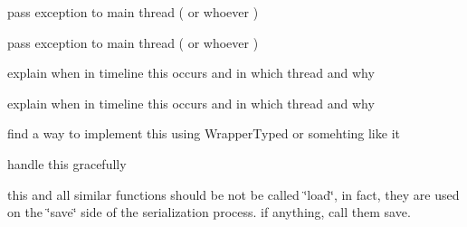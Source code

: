 
\begin{DoxyRefList}
\item[\label{todo__todo000008}%
\hypertarget{todo__todo000008}{}%
\-Member \hyperlink{classgal_1_1network_1_1communicating_abd5efaa6563dda2097f69ae3679f87a1}{gal\-:\-:network\-:\-:communicating\-:\-:thread\-\_\-read} ()]pass exception to main thread ( or whoever )  
\item[\label{todo__todo000007}%
\hypertarget{todo__todo000007}{}%
\-Member \hyperlink{classgal_1_1network_1_1communicating_a271caa9e5d4d13fffda9d38218231b2c}{gal\-:\-:network\-:\-:communicating\-:\-:thread\-\_\-write} (boost\-::shared\-\_\-ptr$<$ message $>$)]pass exception to main thread ( or whoever )  
\item[\label{todo__todo000001}%
\hypertarget{todo__todo000001}{}%
\-Member \hyperlink{classglutpp_1_1Camera_1_1Projection_1_1Base_ac42d1a82122668c3958c586eea0d88d3}{glutpp\-:\-:\-Camera\-:\-:\-Projection\-:\-:\-Base\-:\-:step} (double)]explain when in timeline this occurs and in which thread and why  
\item[\label{todo__todo000002}%
\hypertarget{todo__todo000002}{}%
\-Member \hyperlink{classglutpp_1_1Camera_1_1View_1_1Base_a92154fdd1ef6a972cf5d38c51aea616a}{glutpp\-:\-:\-Camera\-:\-:\-View\-:\-:\-Base$<$ \-M\-A\-T\-R\-I\-X\-\_\-\-T, \-T\-I\-M\-E\-\_\-\-T $>$\-:\-:step} (\-T\-I\-M\-E\-\_\-\-T)=0]explain when in timeline this occurs and in which thread and why  
\item[\label{todo__todo000005}%
\hypertarget{todo__todo000005}{}%
\-Class \hyperlink{structglutpp_1_1network_1_1actor_1_1update_1_1addr__raw}{glutpp\-:\-:network\-:\-:actor\-:\-:update\-:\-:addr\-\_\-raw} ]find a way to implement this using \-Wrapper\-Typed or somehting like it  
\item[\label{todo__todo000006}%
\hypertarget{todo__todo000006}{}%
\-Member \hyperlink{structglutpp_1_1network_1_1actor_1_1update_1_1addr__raw_a4883db7c0b5227e0fcb124f786a121c1}{glutpp\-:\-:network\-:\-:actor\-:\-:update\-:\-:addr\-\_\-raw\-:\-:load} (\-Archive \&ar, unsigned int const \&version)]handle this gracefully  
\item[\label{todo__todo000004}%
\hypertarget{todo__todo000004}{}%
\-Member \hyperlink{structglutpp_1_1network_1_1actor_1_1update_a1bd07663519737a80df43482d8569a93}{glutpp\-:\-:network\-:\-:actor\-:\-:update\-:\-:load} (boost\-::shared\-\_\-ptr$<$ glutpp\-::actor\-::actor $>$ actor)]this and all similar functions should be not be called \char`\"{}load\char`\"{}, in fact, they are used on the \char`\"{}save\char`\"{} side of the serialization process. if anything, call them save.  

\end{DoxyRefList}
